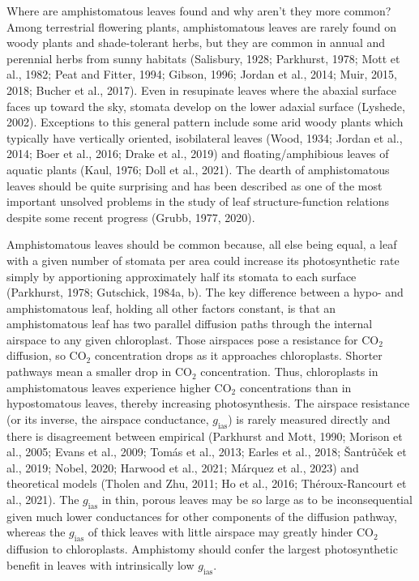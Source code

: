 \documentclass[
  letterpaper,
  DIV=11,
  numbers=noendperiod]{scrartcl}
\begin{document}
Where are amphistomatous leaves found and why aren't they more common?
Among terrestrial flowering plants, amphistomatous leaves are rarely
found on woody plants and shade-tolerant herbs, but they are common in
annual and perennial herbs from sunny habitats (Salisbury, 1928;
Parkhurst, 1978; Mott et al., 1982; Peat and Fitter, 1994; Gibson, 1996;
Jordan et al., 2014; Muir, 2015, 2018; Bucher et al., 2017). Even in
resupinate leaves where the abaxial surface faces up toward the sky,
stomata develop on the lower adaxial surface (Lyshede, 2002). Exceptions
to this general pattern include some arid woody plants which typically
have vertically oriented, isobilateral leaves (Wood, 1934; Jordan et
al., 2014; Boer et al., 2016; Drake et al., 2019) and
floating/amphibious leaves of aquatic plants (Kaul, 1976; Doll et al.,
2021). The dearth of amphistomatous leaves should be quite surprising
and has been described as one of the most important unsolved problems in
the study of leaf structure-function relations despite some recent
progress (Grubb, 1977, 2020).

Amphistomatous leaves should be common because, all else being equal, a
leaf with a given number of stomata per area could increase its
photosynthetic rate simply by apportioning approximately half its
stomata to each surface (Parkhurst, 1978; Gutschick, 1984a, b). The key
difference between a hypo- and amphistomatous leaf, holding all other
factors constant, is that an amphistomatous leaf has two parallel
diffusion paths through the internal airspace to any given chloroplast.
Those airspaces pose a resistance for CO\(_2\) diffusion, so CO\(_2\)
concentration drops as it approaches chloroplasts. Shorter pathways mean
a smaller drop in CO\(_2\) concentration. Thus, chloroplasts in
amphistomatous leaves experience higher CO\(_2\) concentrations than in
hypostomatous leaves, thereby increasing photosynthesis. The airspace
resistance (or its inverse, the airspace conductance,
\(g_\mathrm{ias}\)) is rarely measured directly and there is
disagreement between empirical (Parkhurst and Mott, 1990; Morison et
al., 2005; Evans et al., 2009; Tomás et al., 2013; Earles et al., 2018;
Šantrůček et al., 2019; Nobel, 2020; Harwood et al., 2021; Márquez et
al., 2023) and theoretical models (Tholen and Zhu, 2011; Ho et al.,
2016; Théroux-Rancourt et al., 2021). The \(g_\mathrm{ias}\) in thin,
porous leaves may be so large as to be inconsequential given much lower
conductances for other components of the diffusion pathway, whereas the
\(g_\mathrm{ias}\) of thick leaves with little airspace may greatly
hinder CO\(_2\) diffusion to chloroplasts. Amphistomy should confer the
largest photosynthetic benefit in leaves with intrinsically low
\(g_\mathrm{ias}\).
\end{document}
